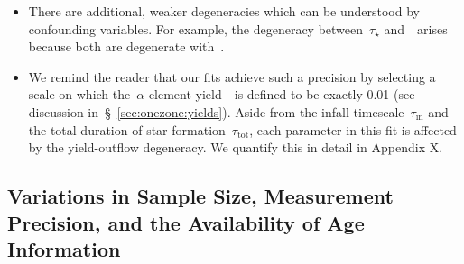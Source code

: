 \documentclass[ms.tex]{subfiles}
\begin{document}
\begin{itemize}
	\item There are additional, weaker degeneracies which can be understood
	by confounding variables.
	For example, the degeneracy between~$\tau_\star$ and~\yfeia~arises because
	both are degenerate with~\yfecc.

	\item We remind the reader that our fits achieve such a precision by
	selecting a scale on which the~$\alpha$ element yield~\yacc~is defined to
	be exactly 0.01 (see discussion in~\S~\ref{sec:onezone:yields}).
	Aside from the infall timescale~$\tau_\text{in}$ and the total duration of
	star formation~$\tau_\text{tot}$, each parameter in this fit is affected by
	the yield-outflow degeneracy.
	We quantify this in detail in Appendix X.

\end{itemize}

\subsection{Variations in Sample Size, Measurement Precision, and the
Availability of Age Information}
\label{sec:mocks:variations}


\end{document}
